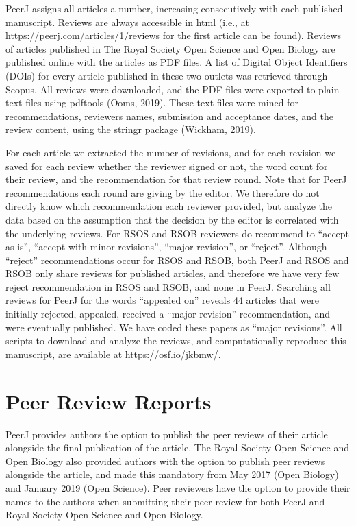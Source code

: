 \documentclass[,jou, a4paper,floatsintext]{apa6}
\begin{document}
PeerJ assigns all articles a number, increasing consecutively with each published manuscript. Reviews are always accessible in html (i.e., at \url{https://peerj.com/articles/1/reviews} for the first article can be found). Reviews of articles published in The Royal Society Open Science and Open Biology are published online with the articles as PDF files. A list of Digital Object Identifiers (DOIs) for every article published in these two outlets was retrieved through Scopus. All reviews were downloaded, and the PDF files were exported to plain text files using pdftools (Ooms, 2019). These text files were mined for recommendations, reviewers names, submission and acceptance dates, and the review content, using the stringr package (Wickham, 2019).

For each article we extracted the number of revisions, and for each revision we saved for each review whether the reviewer signed or not, the word count for their review, and the recommendation for that review round. Note that for PeerJ recommendations each round are giving by the editor. We therefore do not directly know which recommendation each reviewer provided, but analyze the data based on the assumption that the decision by the editor is correlated with the underlying reviews. For RSOS and RSOB reviewers do recommend to \enquote{accept as is}, \enquote{accept with minor revisions}, \enquote{major revision}, or \enquote{reject}. Although \enquote{reject} recommendations occur for RSOS and RSOB, both PeerJ and RSOS and RSOB only share reviews for published articles, and therefore we have very few reject recommendation in RSOS and RSOB, and none in PeerJ. Searching all reviews for PeerJ for the words \enquote{appealed on} reveals 44 articles that were initially rejected, appealed, received a \enquote{major revision} recommendation, and were eventually published. We have coded these papers as \enquote{major revisions}. All scripts to download and analyze the reviews, and computationally reproduce this manuscript, are available at \url{https://osf.io/jkbmw/}.

\hypertarget{peer-review-reports}{%
\section{Peer Review Reports}\label{peer-review-reports}}

PeerJ provides authors the option to publish the peer reviews of their article alongside the final publication of the article. The Royal Society Open Science and Open Biology also provided authors with the option to publish peer reviews alongside the article, and made this mandatory from May 2017 (Open Biology) and January 2019 (Open Science). Peer reviewers have the option to provide their names to the authors when submitting their peer review for both PeerJ and Royal Society Open Science and Open Biology.
\end{document}
